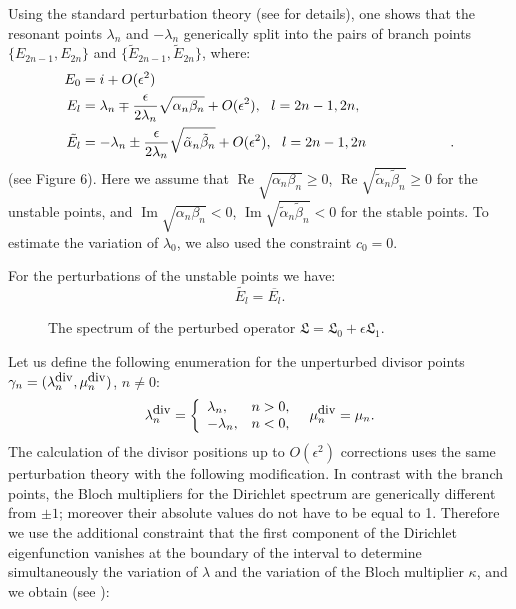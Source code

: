\documentclass[12pt]{article}
\newcommand{\LG}{\mathfrak L}
\renewcommand{\Re}{\mathop{\mathrm{Re}}}
\renewcommand{\Im}{\mathop{\mathrm{Im}}}
\newcommand{\eps}{{\epsilon}}
\begin{document}
Using the standard perturbation theory (see \cite{GS1} for details), one shows that the resonant points $\lambda_n$ and $-\lambda_{n}$ generically split into the pairs of  branch points $\{ E_{2n-1},E_{2n}\}$ and $\{ \tilde{E}_{2n-1},\tilde{E}_{2n}\}$, where:
\begin{align}
\label{eq:bps2}
E_0 &= i + O(\epsilon^2) \nonumber \\
E_{l}& =\lambda_n\mp\frac{\epsilon}{2\lambda_n}\sqrt{\alpha_n\beta_n}+O(\epsilon^2),  \ \ l=2n-1,2n,\\
\tilde{E_{l}} &=-\lambda_n\pm\frac{\epsilon}{2\lambda_n}\sqrt{\tilde\alpha_n\tilde\beta_n}+O(\epsilon^2),  \ \ l=2n-1,2n \hphantom{l=2n-1,2n}. \nonumber
\end{align}
(see Figure 6). Here we assume that $\Re\sqrt{\alpha_n\beta_n}\ge0$, $\Re\sqrt{\tilde\alpha_n\tilde\beta_n}\ge0$ for the unstable points, and  $\Im\sqrt{\alpha_n\beta_n}<0$, $\Im\sqrt{\tilde\alpha_n\tilde\beta_n}<0$ for the stable points. To estimate the variation of $\lambda_0$, we also used the constraint $c_0=0$.

For the perturbations of the unstable points we have:
\begin{equation}
\label{eq:bps3}
\tilde{E_{l}}=\overline{E_{l}}.
\end{equation}


\begin{figure}[H]
\centering
\mbox{\epsfxsize=10cm}
\caption{The spectrum of the perturbed operator $\LG=\LG_0+\eps \LG_1$.}
\end{figure}

Let us define the following enumeration for the  unperturbed divisor points 
$\gamma_n=(\lambda^{\mbox{\small div}}_n, \mu^{\mbox{\small div}}_n)$,  $n\ne 0$:
$$
\lambda^{\mbox{\small div}}_n=\left\{\begin{array}{ll} \lambda_n, & n>0, \\  -\lambda_n, & n<0, \end{array}\right. \ \ 
\mu^{\mbox{\small div}}_n=\mu_n.
$$
The calculation of the divisor positions up to $O(\epsilon^2)$ corrections uses the same perturbation theory with the following modification. In contrast with the branch points, the Bloch multipliers for the Dirichlet spectrum are generically different from $\pm 1$; moreover their absolute values do not have to be equal to 1. Therefore we use the additional constraint that the first component of the Dirichlet eigenfunction vanishes at the boundary of the interval to determine simultaneously the variation of $\lambda$ and the variation of the  Bloch multiplier $\kappa$, and we obtain (see \cite{GS1}):
\end{document}
